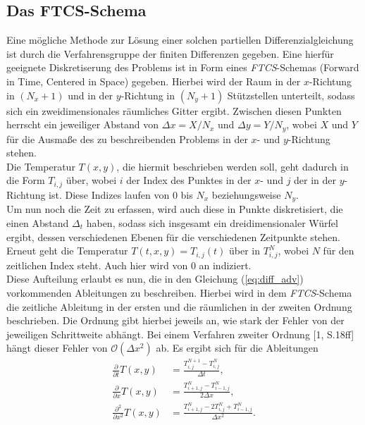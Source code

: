 \documentclass[12pt,a4paper,titlepage,headinclude,bibtotoc]{scrartcl}
\begin{document}
\subsection{Das FTCS-Schema}
\label{sec:ftcs}
Eine mögliche Methode zur Lösung einer solchen partiellen Differenzialgleichung ist durch die Verfahrensgruppe der finiten Differenzen gegeben. Eine hierfür geeignete Diskretiserung des Problems ist in Form eines \textit{FTCS}-Schemas (Forward in Time, Centered in Space) gegeben. Hierbei wird der Raum in der $x$-Richtung in $(N_x+1)$ und in der $y$-Richtung in $(N_y+1)$ Stützstellen unterteilt, sodass sich ein zweidimensionales räumliches Gitter ergibt. Zwischen diesen Punkten herrscht ein jeweiliger Abstand von $\Delta x = X/N_x$ und $\Delta y = Y/N_y$, wobei $X$ und $Y$ für die Ausmaße des zu beschreibenden Problems in der $x$- und $y$-Richtung stehen.\\
Die Temperatur $T(x, y)$, die hiermit beschrieben werden soll, geht dadurch in die Form $T_{i,j}$ über, wobei $i$ der Index des Punktes in der $x$- und $j$ der in der $y$-Richtung ist. Diese Indizes laufen von $0$ bis $N_x$ beziehungsweise $N_y$.\\
Um nun noch die Zeit zu erfassen, wird auch diese in Punkte diskretisiert, die einen Abstand $\Delta_t$ haben, sodass sich insgesamt ein dreidimensionaler Würfel ergibt, dessen verschiedenen Ebenen für die verschiedenen Zeitpunkte stehen. Erneut geht die Temperatur $T(t, x, y) = T_{i,j}(t)$ über in $T_{i,j}^N$, wobei $N$ für den zeitlichen Index steht. Auch hier wird von $0$ an indiziert.\\

Diese Aufteilung erlaubt es nun, die in den Gleichung (\ref{eq:diff_adv}) vorkommenden Ableitungen zu beschreiben.   
Hierbei wird in dem \textit{FTCS}-Schema die zeitliche Ableitung in der ersten und die räumlichen in der zweiten Ordnung beschrieben. Die Ordnung gibt hierbei jeweils an, wie stark der Fehler von der jeweiligen Schrittweite abhängt. Bei einem Verfahren zweiter Ordnung [1, S.18ff] hängt dieser Fehler von $\mathcal{O}(\Delta x^2)$ ab.
Es ergibt sich für die Ableitungen
\begin{align}
\frac{\partial}{\partial t}T(x,y) &= \frac{T_{i,j}^{N+1} - T_{i,j}^{N}}{\Delta t}, \\
\frac{\partial}{\partial x}T(x,y) &= \frac{T_{i+1,j}^{N} - T_{i-1,j}^{N}}{2 \Delta x}, \\
\frac{\partial^2}{\partial x^2}T(x,y) &= \frac{T_{i+1,j}^{N} - 2 T_{i,j}^{N} + T_{i-1,j}^{N}}{ \Delta x^2}.
\end{align}
\end{document}
